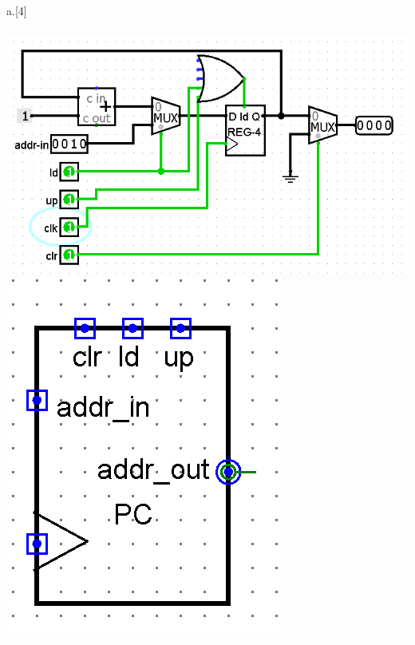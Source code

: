 \begin{question}{a.}[4]
\\
\\\includegraphics{q6-4-1.PNG}
\\\includegraphics{q6-4-2.PNG}
\\
\end{question}

\newpage